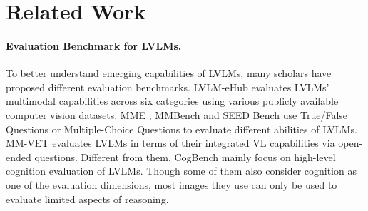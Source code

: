 \section{Related Work}






\paragraph{Evaluation Benchmark for LVLMs.}
To better understand emerging capabilities of LVLMs, many scholars have proposed different evaluation benchmarks.
LVLM-eHub \cite{xu2023lvlm} evaluates LVLMs' multimodal capabilities across six categories using various publicly available computer vision datasets.
MME \cite{fu2023mme}, MMBench \cite{liu2023mmbench} and SEED Bench \cite{li2023seed} use True/False Questions or Multiple-Choice Questions to evaluate different abilities of LVLMs.
MM-VET \cite{yu2023mm} evaluates LVLMs in terms of their integrated VL capabilities via open-ended questions. 
Different from them, CogBench mainly focus on high-level cognition evaluation of LVLMs. 
Though some of them also consider cognition as one of the evaluation dimensions, most images they use can only be used to evaluate limited aspects of reasoning.

